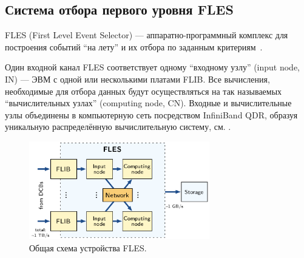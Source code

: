 \subsection{Система отбора первого уровня FLES}\label{sec:secFLES}

\bigskip

FLES (First Level Event Selector) --- аппаратно-программный комплекс для построения событий ``на лету'' и их отбора по заданным критериям~\cite{FLES}.


Один входной канал FLES соответствует одному ``входному узлу'' (input node, IN) --- ЭВМ с одной или несколькими платами FLIB. Все вычисления, необходимые для отбора данных будут осуществляться на так называемых ``вычислительных узлах'' (computing node, CN). Входные и вычислительные узлы объединены в компьютерную сеть посредством InfiniBand QDR, образуя уникальную распределённую вычислительную систему, см. .

\begin{figure}[H]
\centering
\includegraphics[width=0.7\textwidth]{pictures/FLESarch.png}
\caption{Общая схема устройства FLES.}
\label{fig:FLESarch}
\end{figure}


